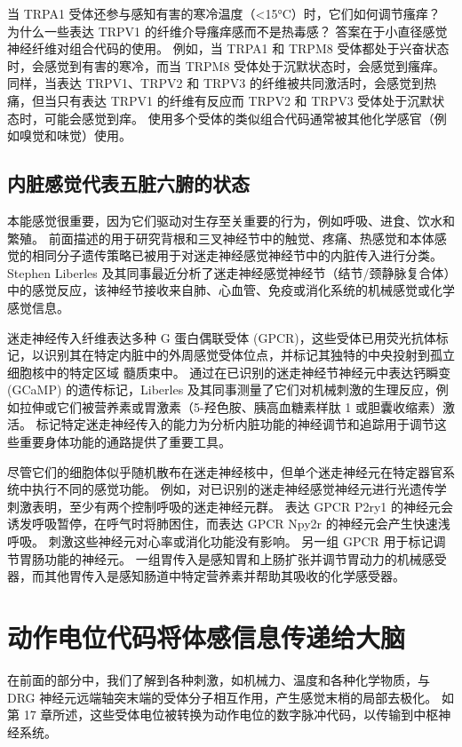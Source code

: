 当 TRPA1 受体还参与感知有害的寒冷温度（<15°C）时，它们如何调节瘙痒？ 为什么一些表达 TRPV1 的纤维介导瘙痒感而不是热毒感？ 答案在于小直径感觉神经纤维对组合代码的使用。 例如，当 TRPA1 和 TRPM8 受体都处于兴奋状态时，会感觉到有害的寒冷，而当 TRPM8 受体处于沉默状态时，会感觉到瘙痒。 同样，当表达 TRPV1、TRPV2 和 TRPV3 的纤维被共同激活时，会感觉到热痛，但当只有表达 TRPV1 的纤维有反应而 TRPV2 和 TRPV3 受体处于沉默状态时，可能会感觉到痒。 使用多个受体的类似组合代码通常被其他化学感官（例如嗅觉和味觉）使用。

\subsection{内脏感觉代表五脏六腑的状态}

本能感觉很重要，因为它们驱动对生存至关重要的行为，例如呼吸、进食、饮水和繁殖。 前面描述的用于研究背根和三叉神经节中的触觉、疼痛、热感觉和本体感觉的相同分子遗传策略已被用于对迷走神经感觉神经节中的内脏传入进行分类。 Stephen Liberles 及其同事最近分析了迷走神经感觉神经节（结节/颈静脉复合体）中的感觉反应，该神经节接收来自肺、心血管、免疫或消化系统的机械感觉或化学感觉信息。

迷走神经传入纤维表达多种 G 蛋白偶联受体 (GPCR)，这些受体已用荧光抗体标记，以识别其在特定内脏中的外周感觉受体位点，并标记其独特的中央投射到孤立细胞核中的特定区域 髓质束中。 通过在已识别的迷走神经节神经元中表达钙瞬变 (GCaMP) 的遗传标记，Liberles 及其同事测量了它们对机械刺激的生理反应，例如拉伸或它们被营养素或胃激素（5-羟色胺、胰高血糖素样肽 1 或胆囊收缩素）激活。 标记特定迷走神经传入的能力为分析内脏功能的神经调节和追踪用于调节这些重要身体功能的通路提供了重要工具。

尽管它们的细胞体似乎随机散布在迷走神经核中，但单个迷走神经元在特定器官系统中执行不同的感觉功能。 例如，对已识别的迷走神经感觉神经元进行光遗传学刺激表明，至少有两个控制呼吸的迷走神经元群。 表达 GPCR P2ry1 的神经元会诱发呼吸暂停，在呼气时将肺困住，而表达 GPCR Npy2r 的神经元会产生快速浅呼吸。 刺激这些神经元对心率或消化功能没有影响。 另一组 GPCR 用于标记调节胃肠功能的神经元。 一组胃传入是感知胃和上肠扩张并调节胃动力的机械感受器，而其他胃传入是感知肠道中特定营养素并帮助其吸收的化学感受器。

\section{动作电位代码将体感信息传递给大脑}
在前面的部分中，我们了解到各种刺激，如机械力、温度和各种化学物质，与 DRG 神经元远端轴突末端的受体分子相互作用，产生感觉末梢的局部去极化。 如第 17 章所述，这些受体电位被转换为动作电位的数字脉冲代码，以传输到中枢神经系统。

